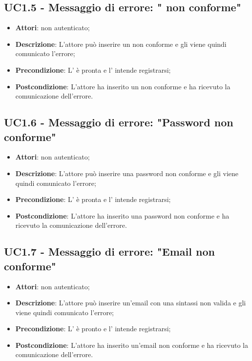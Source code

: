 \subsection{UC1.5 - Messaggio di errore: " non conforme"}
\label{ssec:UC1.5}
\begin{itemize}
\item \textbf{Attori}:  non autenticato;
\item \textbf{Descrizione}: L'attore può inserire un  non conforme e gli viene quindi comunicato l'errore;
\item \textbf{Precondizione}: L' è pronta e l' intende registrarsi;
\item \textbf{Postcondizione}: L'attore ha inserito un  non conforme e ha ricevuto la comunicazione dell'errore.
\end{itemize}
\subsection{UC1.6 - Messaggio di errore: "Password non conforme"}
\label{ssec:UC1.6}
\begin{itemize}
\item \textbf{Attori}:  non autenticato;
\item \textbf{Descrizione}: L'attore può inserire una password non conforme e gli viene quindi comunicato l'errore;
\item \textbf{Precondizione}: L' è pronta e l' intende registrarsi;
\item \textbf{Postcondizione}: L'attore ha inserito una password non conforme e ha ricevuto la comunicazione dell'errore.
\end{itemize}
\subsection{UC1.7 - Messaggio di errore: "Email non conforme"}
\label{ssec:UC1.7}
\begin{itemize}
\item \textbf{Attori}:  non autenticato;
\item \textbf{Descrizione}: L'attore può inserire un'email con una sintassi non valida e gli viene quindi comunicato l'errore;
\item \textbf{Precondizione}: L' è pronto e l' intende registrarsi;
\item \textbf{Postcondizione}: L'attore ha inserito un'email non conforme e ha ricevuto la comunicazione dell'errore.
\end{itemize}
\newpage
